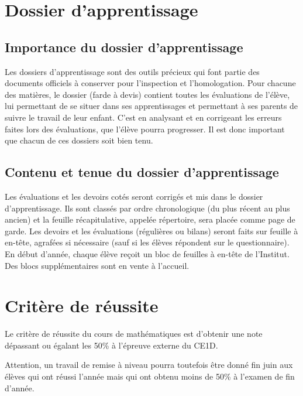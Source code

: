 \documentclass[parskip=half-, numbers=enddot]{scrartcl}
\begin{document}

\section{Dossier d'apprentissage}

\subsection{Importance du dossier d'apprentissage}

Les dossiers d'apprentissage sont des outils précieux qui font partie
des documents officiels à conserver pour l'inspection et l'homologation.
Pour chacune des matières, le dossier (farde à devis) contient toutes
les évaluations de l'élève, lui permettant de se situer dans ses
apprentissages et permettant à ses parents de suivre le travail de leur
enfant. C'est en analysant et en corrigeant les erreurs faites lors des
évaluations, que l'élève pourra progresser. Il est donc important que
chacun de ces dossiers soit bien tenu.

\subsection{Contenu et tenue du dossier d'apprentissage}

Les évaluations et les devoirs cotés seront corrigés et mis dans le
dossier d'apprentissage. Ils sont classés par ordre chronologique (du
plus récent au plus ancien) et la feuille récapitulative, appelée
répertoire, sera placée comme page de garde. Les devoirs et les
évaluations (régulières ou bilans) seront faits sur feuille à en-tête,
agrafées si nécessaire (sauf si les élèves répondent sur le
questionnaire). En début d'année, chaque élève reçoit un bloc de
feuilles à en-tête de l'Institut. Des blocs supplémentaires sont en
vente à l'accueil.

\section{Critère de réussite}

Le critère de réussite du cours de mathématiques est d'obtenir une note dépassant ou égalant les 50\% à l'épreuve externe du CE1D.

Attention, un travail de remise à niveau pourra toutefois être donné fin juin aux élèves qui ont réussi l'année mais qui ont obtenu moins de 50\% à l'examen de fin d'année.
\end{document}
